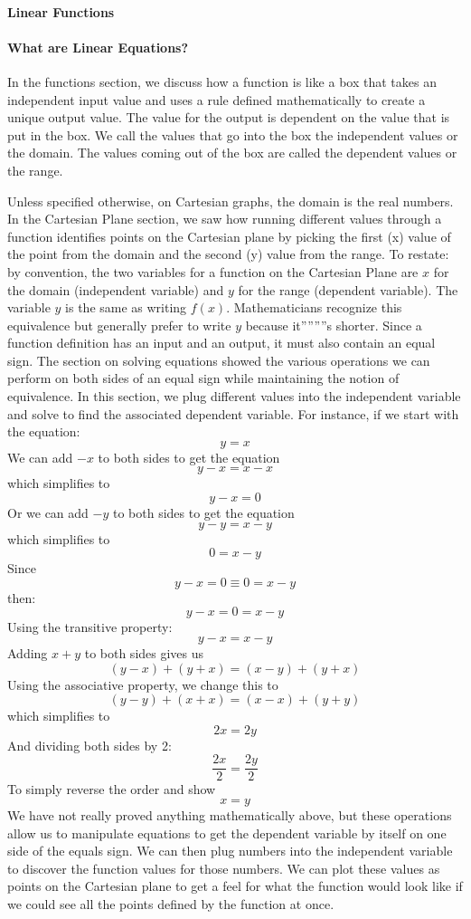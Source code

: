 \paragraph{Linear Functions}

\paragraph{What are Linear Equations?}

In the functions section, we discuss how a function is like a box that takes an independent input value and uses a rule defined mathematically to create a unique output value. The value for the output is dependent on the value that is put in the box. We call the values that go into the box the independent values or the domain. The values coming out of the box are called the dependent values or the range.

Unless specified otherwise, on Cartesian graphs, the domain is the real numbers. In the Cartesian Plane section, we saw how running different values through a function identifies points on the Cartesian plane by picking the first (x) value of the point from the domain and the second (y) value from the range. To restate: by convention, the two variables for a function on the Cartesian Plane are $x$ for the domain (independent variable) and $y$ for the range (dependent variable). The variable $y$ is the same as writing $f(x)$. Mathematicians recognize this equivalence but generally prefer to write $y$ because it''''''''s shorter. Since a function definition has an input and an output, it must also contain an equal sign. The section on solving equations showed the various operations we can perform on both sides of an equal sign while maintaining the notion of equivalence. In this section, we plug different values into the independent variable and solve to find the associated dependent variable. For instance, if we start with the equation:
$$
y = x
$$
We can add $-x$ to both sides to get the equation
$$
y - x = x - x
$$
which simplifies to
$$
y - x = 0
$$
Or we can add $-y$ to both sides to get the equation
$$
y - y = x - y
$$
which simplifies to
$$
0 = x - y
$$
Since
$$
y - x = 0 \equiv 0 = x - y
$$
then:
$$
y - x = 0 = x - y
$$
Using the transitive property:
$$
y - x = x - y
$$
Adding $x + y$ to both sides gives us
$$
(y - x) + (y + x) = (x - y) + (y + x)
$$
Using the associative property, we change this to
$$
(y - y) + (x + x) = (x - x) + (y + y)
$$
which simplifies to
$$
2x = 2y
$$
And dividing both sides by 2:
$$
\frac{2x}{2} = \frac{2y}{2}
$$
To simply reverse the order and show
$$
x = y
$$
We have not really proved anything mathematically above, but these operations allow us to manipulate equations to get the dependent variable by itself on one side of the equals sign. We can then plug numbers into the independent variable to discover the function values for those numbers. We can plot these values as points on the Cartesian plane to get a feel for what the function would look like if we could see all the points defined by the function at once.

